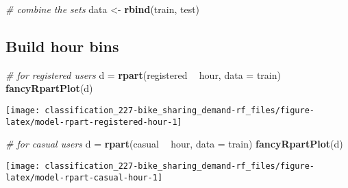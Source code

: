 \documentclass[]{book}
\newenvironment{Shaded}{\begin{snugshade}}{\end{snugshade}}
\newcommand{\CommentTok}[1]{\textcolor[rgb]{0.56,0.35,0.01}{\textit{#1}}}
\newcommand{\DataTypeTok}[1]{\textcolor[rgb]{0.13,0.29,0.53}{#1}}
\newcommand{\KeywordTok}[1]{\textcolor[rgb]{0.13,0.29,0.53}{\textbf{#1}}}
\newcommand{\NormalTok}[1]{#1}
\newcommand{\OperatorTok}[1]{\textcolor[rgb]{0.81,0.36,0.00}{\textbf{#1}}}
\newcommand{\StringTok}[1]{\textcolor[rgb]{0.31,0.60,0.02}{#1}}
\begin{document}
\begin{Shaded}
\begin{Highlighting}[]
\CommentTok{# combine the sets}
\NormalTok{data <-}\StringTok{ }\KeywordTok{rbind}\NormalTok{(train, test)}
\end{Highlighting}
\end{Shaded}

\hypertarget{build-hour-bins}{%
\subsection{Build hour bins}\label{build-hour-bins}}

\begin{Shaded}
\begin{Highlighting}[]
\CommentTok{# for registered users}
\NormalTok{d =}\StringTok{ }\KeywordTok{rpart}\NormalTok{(registered }\OperatorTok{~}\StringTok{ }\NormalTok{hour, }\DataTypeTok{data =}\NormalTok{ train)}
\KeywordTok{fancyRpartPlot}\NormalTok{(d)}
\end{Highlighting}
\end{Shaded}

\begin{center}\texttt{[image: classification\_227-bike\_sharing\_demand-rf\_files/figure-latex/model-rpart-registered-hour-1]} \end{center}

\begin{Shaded}
\begin{Highlighting}[]
\CommentTok{# for casual users}
\NormalTok{d =}\StringTok{ }\KeywordTok{rpart}\NormalTok{(casual }\OperatorTok{~}\StringTok{ }\NormalTok{hour, }\DataTypeTok{data =}\NormalTok{ train)}
\KeywordTok{fancyRpartPlot}\NormalTok{(d)}
\end{Highlighting}
\end{Shaded}

\begin{center}\texttt{[image: classification\_227-bike\_sharing\_demand-rf\_files/figure-latex/model-rpart-casual-hour-1]} \end{center}
\end{document}
